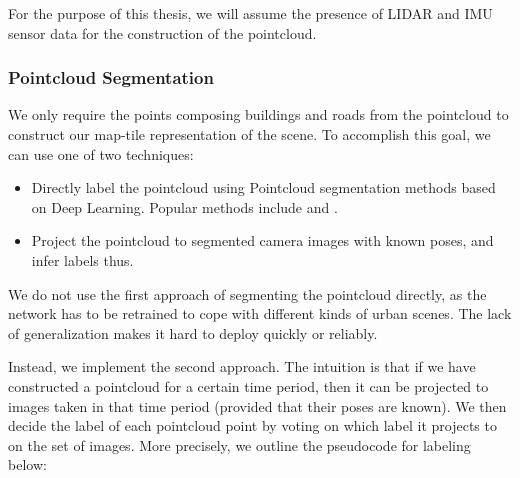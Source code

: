 For the purpose of this thesis, we will assume the presence of LIDAR and IMU sensor data for the construction of the pointcloud. 

\subsubsection{Pointcloud Segmentation}

We only require the points composing buildings and roads from the pointcloud to construct our map-tile representation of the scene. To accomplish this goal, we can use one of two techniques: 

\begin{itemize}
	\item Directly label the pointcloud using Pointcloud segmentation methods based on Deep Learning. Popular methods include \cite{qi2016} and \cite{alnaggar2020}.\\
	
	\item Project the pointcloud to segmented camera images with known poses, and infer labels thus. 
\end{itemize}

We do not use the first approach of segmenting the pointcloud directly, as the network has to be retrained to cope with different kinds of urban scenes. The lack of generalization makes it hard to deploy quickly or reliably. 

Instead, we implement the second approach. The intuition is that if we have constructed a pointcloud for a certain time period, then it can be projected to images taken in that time period (provided that their poses are known). We then decide the label of each pointcloud point by voting on which label it projects to on the set of images. More precisely, we outline the pseudocode for labeling below:

